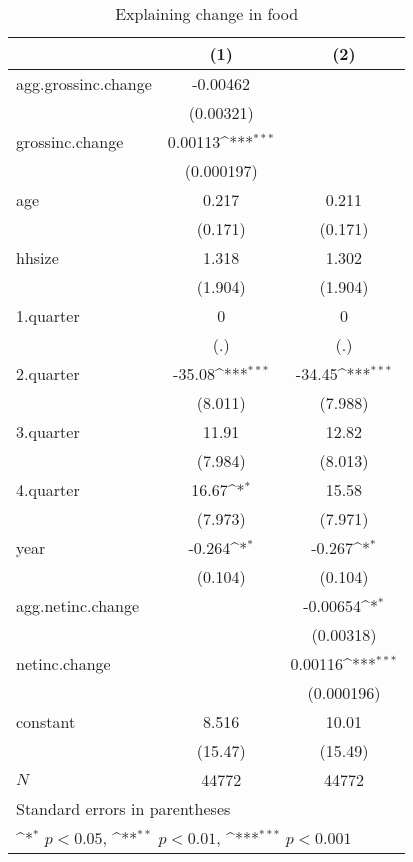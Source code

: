 \begin{table}[htbp]\centering
\def\sym#1{\ifmmode^{#1}\else\(^{#1}\)\fi}
\caption{\label{tab:food-deltainc} Explaining change in food}
\begin{tabular}{l*{2}{c}}
\hline\hline
            &\multicolumn{1}{c}{(1)}         &\multicolumn{1}{c}{(2)}         \\
\hline
agg.grossinc.change&    -0.00462         &                     \\
            &   (0.00321)         &                     \\
grossinc.change&     0.00113\sym{***}&                     \\
            &  (0.000197)         &                     \\
age         &       0.217         &       0.211         \\
            &     (0.171)         &     (0.171)         \\
hhsize      &       1.318         &       1.302         \\
            &     (1.904)         &     (1.904)         \\
1.quarter   &           0         &           0         \\
            &         (.)         &         (.)         \\
2.quarter   &      -35.08\sym{***}&      -34.45\sym{***}\\
            &     (8.011)         &     (7.988)         \\
3.quarter   &       11.91         &       12.82         \\
            &     (7.984)         &     (8.013)         \\
4.quarter   &       16.67\sym{*}  &       15.58         \\
            &     (7.973)         &     (7.971)         \\
year        &      -0.264\sym{*}  &      -0.267\sym{*}  \\
            &     (0.104)         &     (0.104)         \\
agg.netinc.change&                     &    -0.00654\sym{*}  \\
            &                     &   (0.00318)         \\
netinc.change&                     &     0.00116\sym{***}\\
            &                     &  (0.000196)         \\
constant    &       8.516         &       10.01         \\
            &     (15.47)         &     (15.49)         \\
\hline
\(N\)       &       44772         &       44772         \\
\hline\hline
\multicolumn{3}{l}{\footnotesize Standard errors in parentheses}\\
\multicolumn{3}{l}{\footnotesize \sym{*} \(p<0.05\), \sym{**} \(p<0.01\), \sym{***} \(p<0.001\)}\\
\end{tabular}
\end{table}

